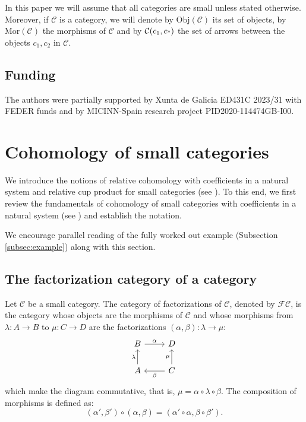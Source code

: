 \documentclass[12pt,reqno]{amsart}
\theoremstyle{definition}
\theoremstyle{remark}
\numberwithin{figure}{section}%
\newcommand{\CC}{\mathcal{C}}
\newcommand{\F}{\mathcal{F}}
\begin{document}
In this paper we will assume that all categories are small unless stated otherwise. Moreover, if $\CC$ is a category, we will denote by $\mathrm{Obj}(\CC)$ its set of objects, by $\mathrm{Mor}(\CC)$ the morphisms of $\CC$ and by $\CC(c_1,c_")$ the set of arrows between the objects $c_1,c_2$ in $\CC$. 


\subsection*{Funding}The authors were partially supported by  Xunta de Galicia ED431C 2023/31 with FEDER funds and by MICINN-Spain research project PID2020-114474GB-I00.

\section{Cohomology of small categories} \label{sec: COH}

We introduce the notions of relative cohomology  with coefficients in a natural system and relative cup product for small categories (see \cite{Baues1989TheCO}). To this end, we first review the fundamentals of cohomology of small categories with coefficients in a natural system (see \cite{BAUES0,BAUES1}) and establish the notation.  

We encourage parallel reading of the fully worked out example (Subsection \ref{subsec:example}) along with this section. 

\subsection{The factorization category of a category}

Let $\CC$ be a small category. The category of factorizations of $\CC$, denoted by $\F \CC$, is the category whose objects are the morphisms of $\CC$ and whose morphisms from $\lambda \colon A \rightarrow B$ to $\mu \colon C \rightarrow D$ are the factorizations $(\alpha, \beta) \colon \lambda \rightarrow \mu$:
$$
\begin{tikzcd}
B \arrow[r, "\alpha"] & D                                   \\
A \arrow[u, "\lambda"]      & C \arrow[u, "\mu"] \arrow[l, "\beta"]
\end{tikzcd}$$
which make the diagram commutative, that is, $\mu=\alpha\circ \lambda \circ \beta$.
The composition of morphisms is defined as: $$(\alpha', \beta') \circ (\alpha, \beta)=(\alpha' \circ \alpha, \beta \circ \beta').$$
\end{document}
